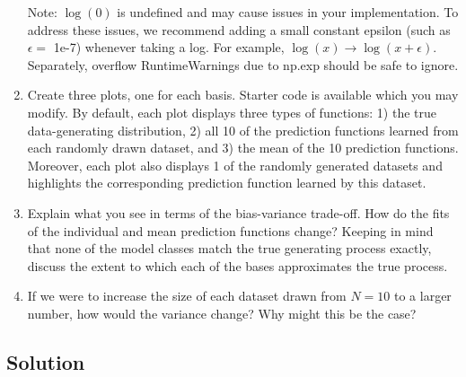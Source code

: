 \documentclass[submit]{harvardml}
\begin{document}
\begin{problem}
\begin{enumerate}
   Note: $\log(0)$ is undefined and may cause issues in your implementation.
   To address these issues, we recommend adding a small constant epsilon
   (such as $\epsilon = $ 1e-7) whenever taking a log. For example,
   $\log(x) \rightarrow \log(x + \epsilon)$.
   Separately, overflow RuntimeWarnings due to np.exp should be safe to ignore.

\item Create three plots, one for each basis. Starter code is available which you may modify.
By default, each plot displays three types of functions:
1) the true data-generating distribution,
2) all 10 of the prediction functions learned from each randomly drawn dataset, and
3) the mean of the 10 prediction functions.
Moreover, each plot also displays 1 of the randomly generated datasets and highlights the corresponding prediction function learned by this dataset.

\item Explain what you see in terms of the bias-variance trade-off.
How do the fits of the individual and mean prediction functions change?
Keeping in mind that none of the model classes match the true generating process exactly, discuss the extent to which each of the bases approximates the true process.

\item If we were to increase the size of each dataset drawn from $N = 10$ to a larger number, how would the variance change? Why might this be the case?
  
\end{enumerate}

\end{problem}

\newpage

\subsection*{Solution}
\end{document}
